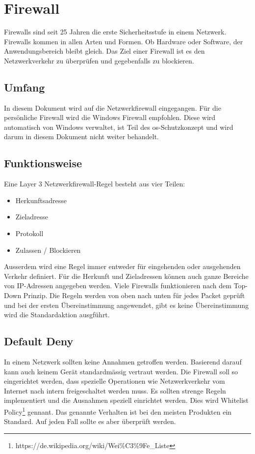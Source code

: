 \chapter{Firewall}
Firewalls sind seit 25 Jahren die erste Sicherheitsstufe in einem Netzwerk.
Firewalls kommen in allen Arten und Formen.
Ob Hardware oder Software, der Anwendungsbereich bleibt gleich.
Das Ziel einer Firewall ist es den Netzwerkverkehr zu überprüfen und gegebenfalls zu blockieren.


\section{Umfang}
In diesem Dokument wird auf die Netzwerkfirewall eingegangen.
Für die persönliche Firewall wird die Windows Firewall empfohlen.
Diese wird automatisch von Windows verwaltet, ist Teil des \acrshort{os}-Schutzkonzept und wird darum in diesem Dokument nicht weiter behandelt.

\section{Funktionsweise}
Eine Layer 3 Netzwerkfirewall-Regel besteht aus vier Teilen:
\begin{itemize}
    \item Herkunftsadresse
    \item Zieladresse
    \item Protokoll
    \item Zulassen / Blockieren
\end{itemize}

Ausserdem wird eine Regel immer entweder für eingehenden oder ausgehenden Verkehr definiert.
Für die Herkunft und Zieladressen können auch ganze Bereiche von IP-Adressen angegeben werden.
Viele Firewalls funktionieren nach dem Top-Down Prinzip. 
Die Regeln werden von oben nach unten für jedes Packet geprüft und bei der ersten Übereinstimmung angewendet, gibt es keine Übereinstimmung wird die Standardaktion ausgführt.

\section{Default Deny}
In einem Netzwerk sollten keine Annahmen getroffen werden.
Basierend darauf kann auch keinem Gerät standardmässig vertraut werden.
Die Firewall soll so eingerichtet werden, dass spezielle Operationen wie Netzwerkverkehr vom Internet nach intern freigeschaltet werden muss.
Es sollten strenge Regeln implementiert und die Ausnahmen speziell einrichtet werden.
Dies wird Whitelist Policy\footnote{https://de.wikipedia.org/wiki/Wei\%C3\%9Fe\_Liste} gennant.
Das genannte Verhalten ist bei den meisten Produkten ein Standard.
Auf jeden Fall sollte es aber überprüft werden.\\


